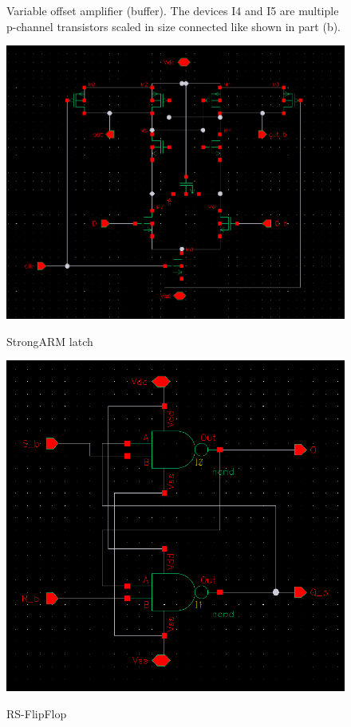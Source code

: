 \begin{figure}[H]
  \caption{Variable offset amplifier (buffer). The devices I4 and I5 are multiple p-channel transistors scaled in size connected like shown in part (b). }
  \label{fig:voa}
\end{figure}

\begin{figure}[H]
  \centering
  {\includegraphics[scale=0.6]{schematics/strongARM.png}}
  \caption{StrongARM latch}
  \label{fig:strongARM}
\end{figure}

\begin{figure}[H]
  \centering
  {\includegraphics[scale=0.5]{schematics/rs_flipflop.png}}
  \caption{RS-FlipFlop}
  \label{fig:rs_flipflop}
\end{figure}